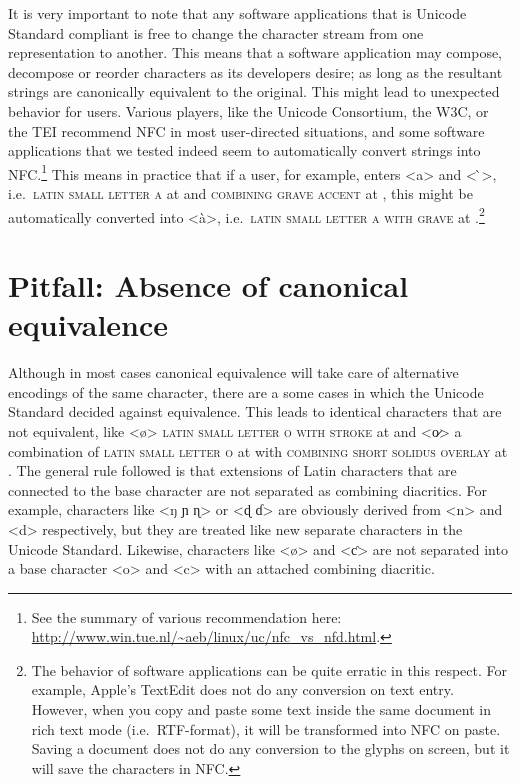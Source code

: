 It is very important to note that any software applications that is Unicode
Standard compliant is free to change the character stream from one
representation to another. This means that a software application may compose,
decompose or reorder characters as its developers desire; as long as the
resultant strings are canonically equivalent to the original. This might lead to
unexpected behavior for users. Various players, like the Unicode Consortium, the
W{\large 3}C, or the TEI recommend NFC in most user-directed situations, and
some software applications that we tested indeed seem to automatically convert
strings into NFC.\footnote{See the summary of various recommendation here:
\url{http://www.win.tue.nl/~aeb/linux/uc/nfc_vs_nfd.html}.} This means in
practice that if a user, for example, enters <a> and < ̀>, i.e.~\textsc{latin
small letter a} at  and \textsc{combining grave accent} at ,
this might be automatically converted into <à>, i.e.~\textsc{latin small letter
a with grave} at .\footnote{The behavior of software applications can
be quite erratic in this respect. For example, Apple's TextEdit does not do any
conversion on text entry. However, when you copy and paste some text inside the
same document in rich text mode (i.e.~RTF-format), it will be transformed into
NFC on paste. Saving a document does not do any conversion to the glyphs on
screen, but it will save the characters in NFC.}

\section{Pitfall: Absence of canonical equivalence}
\label{pitfall-absence-of-equivalence}

Although in most cases canonical equivalence will take care of alternative
encodings of the same character, there are a some cases in which the Unicode
Standard decided against equivalence. This leads to identical characters that
are not equivalent, like <ø> \textsc{latin small letter o with stroke} at
 and <o̷> a combination of \textsc{latin small letter o} at 
with \textsc{combining short solidus overlay} at .
The general rule followed is that extensions of Latin characters that are
connected to the base character are not separated as combining diacritics. For
example, characters like <ŋ ɲ ɳ> or <ɖ ɗ> are obviously derived from <n> and <d>
respectively, but they are treated like new separate characters in the Unicode
Standard. Likewise, characters like <ø> and <ƈ> are not separated into a base 
character <o> and <c> with an attached combining diacritic.

